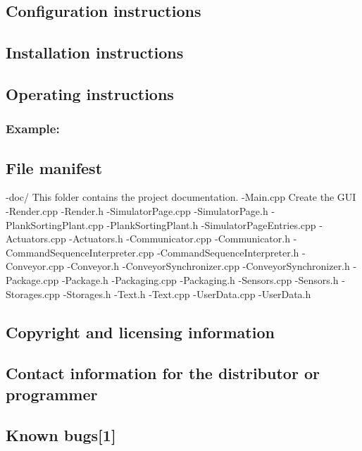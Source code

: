 \subsection*{Configuration instructions}

\subsection*{Installation instructions}

\subsection*{Operating instructions}

\subsubsection*{Example\-:}

\subsection*{File manifest}

-\/doc/ This folder contains the project documentation. -\/\-Main.\-cpp Create the G\-U\-I -\/\-Render.\-cpp -\/\-Render.\-h -\/\-Simulator\-Page.\-cpp -\/\-Simulator\-Page.\-h -\/\-Plank\-Sorting\-Plant.\-cpp -\/\-Plank\-Sorting\-Plant.\-h -\/\-Simulator\-Page\-Entries.\-cpp -\/\-Actuators.\-cpp -\/\-Actuators.\-h -\/\-Communicator.\-cpp -\/\-Communicator.\-h -\/\-Command\-Sequence\-Interpreter.\-cpp -\/\-Command\-Sequence\-Interpreter.\-h -\/\-Conveyor.\-cpp -\/\-Conveyor.\-h -\/\-Conveyor\-Synchronizer.\-cpp -\/\-Conveyor\-Synchronizer.\-h -\/\-Package.\-cpp -\/\-Package.\-h -\/\-Packaging.\-cpp -\/\-Packaging.\-h -\/\-Sensors.\-cpp -\/\-Sensors.\-h -\/\-Storages.\-cpp -\/\-Storages.\-h -\/\-Text.\-h -\/\-Text.\-cpp -\/\-User\-Data.\-cpp -\/\-User\-Data.\-h

\subsection*{Copyright and licensing information}

\subsection*{Contact information for the distributor or programmer}

\subsection*{Known bugs\mbox{[}1\mbox{]}}

